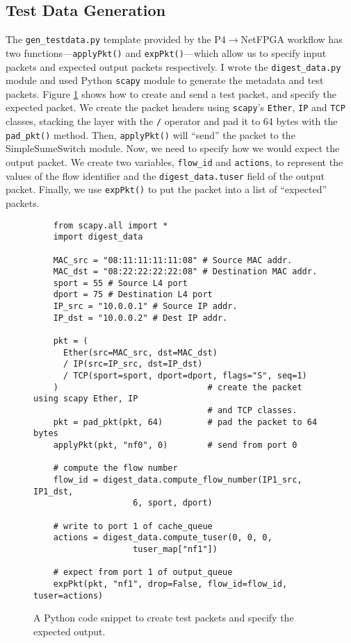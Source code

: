 \subsection{Test Data Generation}
The \texttt{gen\_testdata.py} template provided by the P4$\rightarrow$NetFPGA workflow has two functions---\verb|applyPkt()| and \verb|expPkt()|---which allow us to specify input packets and expected output packets respectively. I wrote the \verb|digest_data.py| module and used Python \texttt{scapy} module to generate the metadata and test packets. Figure \ref{fig:pkt} shows how to create and send a test packet, and specify the expected packet. We create the packet headers using \texttt{scapy}'s \texttt{Ether}, \texttt{IP} and \texttt{TCP} classes, stacking the layer with the \texttt{/} operator and pad it to 64 bytes with the \texttt{pad\_pkt()} method. Then, \verb|applyPkt()| will ``send'' the packet to the SimpleSumeSwitch module. Now, we need to specify how we would expect the output packet. We create two variables, \verb|flow_id| and \verb|actions|, to represent the values of the flow identifier and the \verb|digest_data.tuser| field of the output packet. Finally, we use \verb|expPkt()| to put the packet into a list of ``expected'' packets.

\begin{figure}[!h]
{\renewcommand{\baselinestretch}{0.8}\small
	\begin{verbatim}
    from scapy.all import *
    import digest_data
	
    MAC_src = "08:11:11:11:11:08" # Source MAC addr.
    MAC_dst = "08:22:22:22:22:08" # Destination MAC addr.
    sport = 55 # Source L4 port 
    dport = 75 # Destination L4 port
    IP_src = "10.0.0.1" # Source IP addr.
    IP_dst = "10.0.0.2" # Dest IP addr.
	
    pkt = (
      Ether(src=MAC_src, dst=MAC_dst)
      / IP(src=IP_src, dst=IP_dst)
      / TCP(sport=sport, dport=dport, flags="S", seq=1)
    )                              # create the packet using scapy Ether, IP 
                                   # and TCP classes.
    pkt = pad_pkt(pkt, 64)         # pad the packet to 64 bytes
    applyPkt(pkt, "nf0", 0)        # send from port 0

    # compute the flow number
    flow_id = digest_data.compute_flow_number(IP1_src, IP1_dst,
                    6, sport, dport)
    
    # write to port 1 of cache_queue
    actions = digest_data.compute_tuser(0, 0, 0, 
                    tuser_map["nf1"])             
    
    # expect from port 1 of output_queue
    expPkt(pkt, "nf1", drop=False, flow_id=flow_id, tuser=actions)
	\end{verbatim}
}
\caption{A Python code snippet to create test packets and specify the expected output.}
\label{fig:pkt}
\end{figure}

